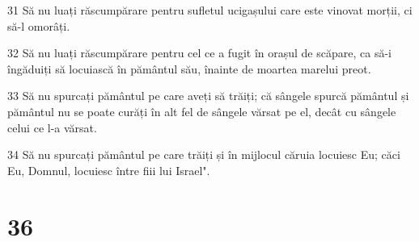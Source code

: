 \par 31 Să nu luați răscumpărare pentru sufletul ucigașului care este vinovat morții, ci să-l omorâți.
\par 32 Să nu luați răscumpărare pentru cel ce a fugit în orașul de scăpare, ca să-i îngăduiți să locuiască în pământul său, înainte de moartea marelui preot.
\par 33 Să nu spurcați pământul pe care aveți să trăiți; că sângele spurcă pământul și pământul nu se poate curăți în alt fel de sângele vărsat pe el, decât cu sângele celui ce l-a vărsat.
\par 34 Să nu spurcați pământul pe care trăiți și în mijlocul căruia locuiesc Eu; căci Eu, Domnul, locuiesc între fiii lui Israel".

\chapter{36}

